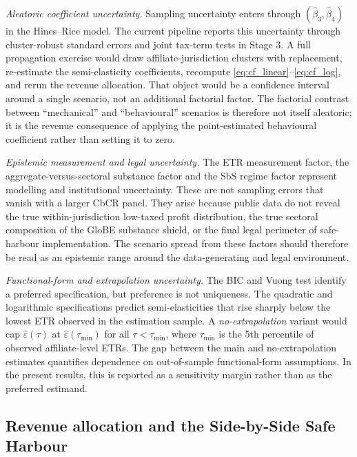 \documentclass[11pt,a4paper]{article}
\begin{document}
\emph{Aleatoric coefficient uncertainty.} Sampling uncertainty enters through $(\hat{\beta}_3,\hat{\beta}_4)$ in the Hines--Rice model. The current pipeline reports this uncertainty through cluster-robust standard errors and joint tax-term tests in Stage 3. A full propagation exercise would draw affiliate-jurisdiction clusters with replacement, re-estimate the semi-elasticity coefficients, recompute \eqref{eq:cf_linear}--\eqref{eq:cf_log}, and rerun the revenue allocation. That object would be a confidence interval around a single scenario, not an additional factorial factor. The factorial contrast between ``mechanical'' and ``behavioural'' scenarios is therefore not itself aleatoric; it is the revenue consequence of applying the point-estimated behavioural coefficient rather than setting it to zero.

\emph{Epistemic measurement and legal uncertainty.} The ETR measurement factor, the aggregate-versus-sectoral substance factor and the SbS regime factor represent modelling and institutional uncertainty. These are not sampling errors that vanish with a larger CbCR panel. They arise because public data do not reveal the true within-jurisdiction low-taxed profit distribution, the true sectoral composition of the GloBE substance shield, or the final legal perimeter of safe-harbour implementation. The scenario spread from these factors should therefore be read as an epistemic range around the data-generating and legal environment.

\emph{Functional-form and extrapolation uncertainty.} The BIC and Vuong test identify a preferred specification, but preference is not uniqueness. The quadratic and logarithmic specifications predict semi-elasticities that rise sharply below the lowest ETR observed in the estimation sample. A \emph{no-extrapolation} variant would cap $\hat{\varepsilon}(\tau)$ at $\hat{\varepsilon}(\tau_{\min})$ for all $\tau < \tau_{\min}$, where $\tau_{\min}$ is the 5th percentile of observed affiliate-level ETRs. The gap between the main and no-extrapolation estimates quantifies dependence on out-of-sample functional-form assumptions. In the present results, this is reported as a sensitivity margin rather than as the preferred estimand.

\subsection{Revenue allocation and the Side-by-Side Safe Harbour}\label{sec:sbs}\label{sec:jan2026}
\end{document}

